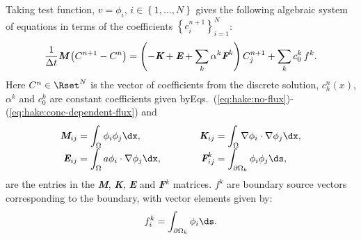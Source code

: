 Taking test function, $v=\phi_i$, $i\in\left\{1,\ldots,N\right\}$
gives the following algebraic system of equations in terms of the
coefficients $\left\{ c^{n+1}_i\right\}^N_{i=1}$:
\begin{equation}
  \label{eq:hake:algebraic-equation}
  \frac{1}{\Delta{}t}\text{\bfseries\itshape M}\left(C^{n+1}-C^n\right) =  \left(-\text{\bfseries\itshape K}+\text{\bfseries\itshape E}+\sum_k\alpha^k\text{\bfseries\itshape F}^k\right)C_j^{n+1}+\sum_k c_0^k\,f^k.
\end{equation}
Here $C^n\in \Rset^N$ is the vector of coefficients from the discrete
solution, $c^n_h(x)$, $\alpha^k$ and $c_0^k$ are constant coefficients
given byEqs.~(\ref{eq:hake:no-flux})-(\ref{eq:hake:conc-dependent-flux})
and\\[-1.0em]
\begin{equation}
  \renewcommand{\arraystretch}{1.7}
  \renewcommand{\baselinestretch}{1.7}
  \begin{array}{r@{\;=\;}lcr@{\;=\;}l}
    \text{\bfseries\itshape M}_{ij}&\displaystyle\int_\Omega\phi_i\phi_j \dx,& \quad\quad&\text{\bfseries\itshape K}_{ij}&\displaystyle\int_\Omega\nabla\phi_i\cdot\nabla\phi_j \dx,\\
    \text{\bfseries\itshape E}_{ij}&\displaystyle\int_\Omega a\phi_i\cdot\nabla\phi_j \dx,& \quad\quad&\text{\bfseries\itshape F}^k_{ij}&\displaystyle\int_{\partial\Omega_k}\phi_i\phi_j \ds,
  \end{array}
  \renewcommand{\arraystretch}{1}
  \renewcommand{\baselinestretch}{1}
  \label{eq:hake:matrices}
\end{equation}
are the entries in the {\bfseries\itshape M}, {\bfseries\itshape K},
{\bfseries\itshape E} and {\bfseries\itshape F}$^k$ matrices. $f^k$
are boundary source vectors corresponding to the \kth boundary, with
vector elements given by:
\begin{equation}
  \label{eq:hake:vector}
  f^k_{i}=\int_{\partial\Omega_k}\phi_i \ds.
\end{equation}


